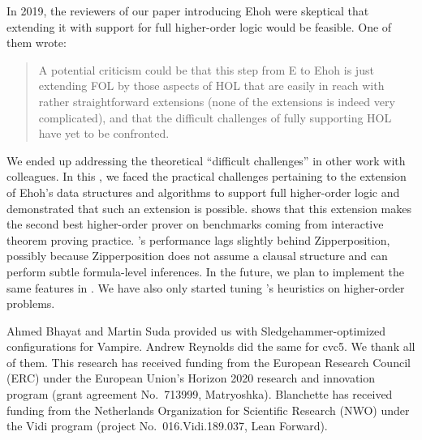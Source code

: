In 2019, the reviewers of our paper introducing Ehoh \cite{section-ehoh} were
skeptical that extending it with support for full higher-order logic would be
feasible. One of them wrote:
%
\begin{quote}
A potential criticism could be that this step from E to Ehoh is just extending
FOL by those aspects of HOL that are easily in reach with rather straightforward
extensions (none of the extensions is indeed very complicated), and that the
difficult challenges of fully supporting HOL have yet to be confronted.
\end{quote}
%
We ended up addressing the theoretical ``difficult challenges'' in other work
with colleagues. In this \paper, we faced the practical challenges pertaining to the extension
of Ehoh's data structures and algorithms to support full higher-order logic and
demonstrated that such an extension is possible.  shows
that this extension makes \ehohii{} the second best higher-order prover on
benchmarks coming from interactive theorem proving practice. \ehohii{}'s
performance lags slightly behind Zipperposition, possibly because Zipperposition
does not assume a clausal structure and can perform subtle formula-level
inferences. In the future, we plan to implement the same features in \ehohii{}.
We have also only started tuning \ehohii{}'s heuristics on higher-order
problems.

\let\Acksize=\footnotesize

\def\ackname{\Acksize Acknowledgment}

\ourpara{\ackname}
{\Acksize
Ahmed Bhayat and Martin Suda provided us
with Sledgehammer-optimized configurations for Vampire. Andrew Reynolds did the
same for cvc5. We thank all of them.
%
This research has received funding from the European Research Council (ERC)
under the European Union's Horizon 2020 research and innovation program (grant
agreement No.\ 713999, Matryoshka).
%
Blanchette has received funding from the Netherlands Organization for
Scientific Research (NWO) under the Vidi program (project No.\
016.Vidi.189.037, Lean Forward).
}






